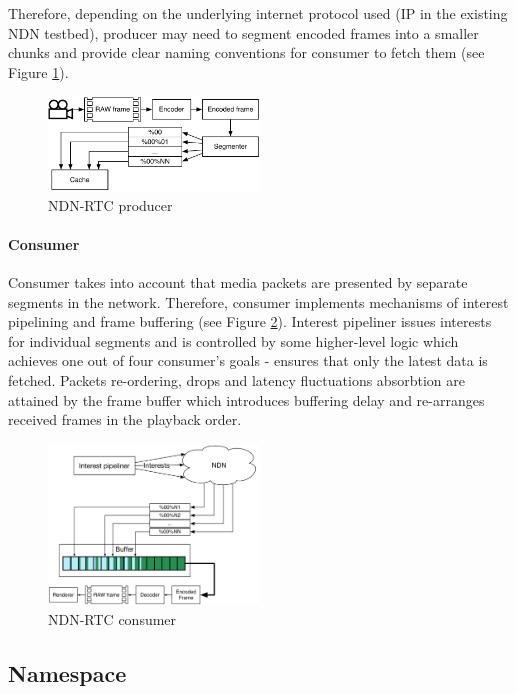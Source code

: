 \documentclass[10pt]{icn/sig-alternate-10pt} %
\newcommand{\ndnrtcName}{NDN-RTC} %
\begin{document}
Therefore, depending on the underlying internet protocol used (IP in the existing NDN testbed), producer may need to segment encoded frames into a smaller chunks and provide clear naming conventions for consumer to fetch them (see Figure \ref{fig:producer}).

\begin{figure}[t!]
\centering
\includegraphics[width=0.5\textwidth]{producer}
\caption{\ndnrtcName{} producer}
\label{fig:producer}
\end{figure}

\paragraph{Consumer}

Consumer takes into account that media packets are presented by separate segments in the network. Therefore, consumer implements mechanisms of interest pipelining and frame buffering (see Figure \ref{fig:consumer}). Interest pipeliner issues interests for individual segments and is controlled by some higher-level logic which achieves one out of four consumer's goals - ensures that only the latest data is fetched. Packets re-ordering, drops and latency fluctuations absorbtion are attained by the frame buffer which introduces buffering delay and re-arranges received frames in the playback order.

\begin{figure}[t!]
\centering
\includegraphics[width=0.5\textwidth]{consumer}
\caption{\ndnrtcName{} consumer}
\label{fig:consumer}
\end{figure}


\subsection{Namespace}
\end{document}
